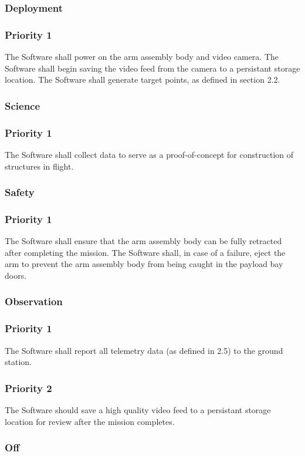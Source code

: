 \documentclass[letterpaper,10pt]{article}
\begin{document}
\subsubsection{Deployment}
\subsubsection{Priority 1}
The Software shall power on the arm assembly body and video camera.
The Software shall begin saving the video feed from the camera to a persistant storage location.
The Software shall generate target points, as defined in section 2.2.
\subsubsection{Science}
\subsubsection{Priority 1}
The Software shall collect data to serve as a proof-of-concept for construction of structures in flight.
\subsubsection{Safety}
\subsubsection{Priority 1}
The Software shall ensure that the arm assembly body can be fully retracted after completing the mission.
The Software shall, in case of a failure, eject the arm to prevent the arm assembly body from being caught in the payload bay doors.
\subsubsection{Observation}
\subsubsection{Priority 1}
The Software shall report all telemetry data (as defined in 2.5) to the ground station.
\subsubsection{Priority 2}
The Software should save a high quality video feed to a persistant storage location for review after the mission completes.
\subsubsection{Off}
\end{document}
